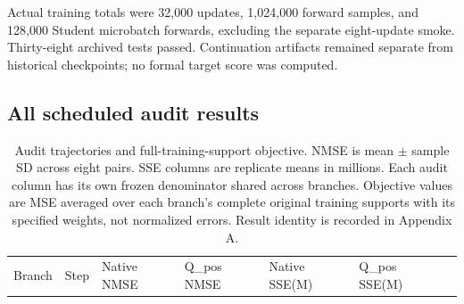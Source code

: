 Actual training totals were 32,000 updates, 1,024,000 forward samples, and 128,000 Student microbatch forwards, excluding the separate eight-update smoke. Thirty-eight archived tests passed. Continuation artifacts remained separate from historical checkpoints; no formal target score was computed.

\subsection{All scheduled audit results}\label{all-scheduled-audit-results}

\begin{longtable}[]{@{}
  >{\raggedright\arraybackslash}p{}
  >{\raggedleft\arraybackslash}p{}
  >{\raggedleft\arraybackslash}p{}
  >{\raggedleft\arraybackslash}p{}
  >{\raggedleft\arraybackslash}p{}
  >{\raggedleft\arraybackslash}p{}
  >{\raggedleft\arraybackslash}p{}@{}}
\caption{Audit trajectories and full-training-support objective. NMSE is mean \(\pm\) sample SD across eight pairs. SSE columns are replicate means in millions. Each audit column has its own frozen denominator shared across branches. Objective values are MSE averaged over each branch's complete original training supports with its specified weights, not normalized errors. Result identity is recorded in Appendix A.}\label{tbl:E1}\tabularnewline
\toprule\noalign{}
\begin{minipage}[b]{\linewidth}\raggedright
Branch
\end{minipage} & \begin{minipage}[b]{\linewidth}\raggedleft
Step
\end{minipage} & \begin{minipage}[b]{\linewidth}\raggedleft
Native NMSE
\end{minipage} & \begin{minipage}[b]{\linewidth}\raggedleft
Q\_pos NMSE
\end{minipage} & \begin{minipage}[b]{\linewidth}\raggedleft
Native SSE(M)
\end{minipage} & \begin{minipage}[b]{\linewidth}\raggedleft
Q\_pos SSE(M)
\end{minipage} & \begin{minipage}[b]{\linewidth}\raggedleft

\end{minipage}
\end{longtable}
